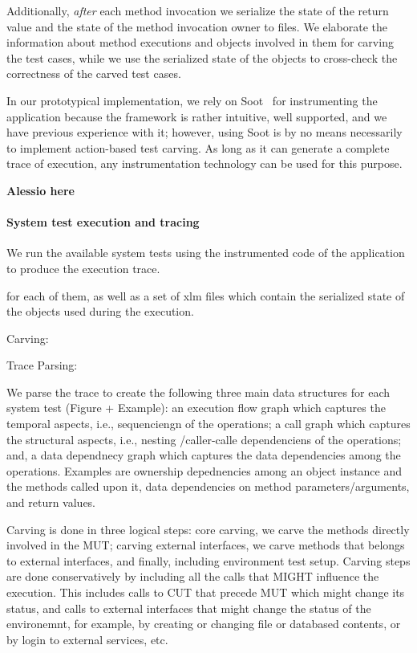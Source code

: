 \documentclass[10pt,conference]{IEEEtran}
\begin{document}
Additionally, \emph{after} each method invocation we serialize the state of the return value and the state of the method invocation owner to files.
%
We elaborate the information about method executions and objects involved in them for carving the test cases, while we use  the serialized state of the objects to cross-check the correctness of the carved test cases.

In our prototypical implementation, we rely on Soot~\cite{} for instrumenting the application because the framework is rather intuitive, well supported, and we have previous experience with it; however, using Soot is by no means necessarily to implement action-based test carving. As long as it can generate a complete trace of execution, any instrumentation technology can be used for this purpose.

\textbf{Alessio here}

\paragraph{System test execution and tracing}
We run the available system tests using the instrumented code of the application to produce the execution trace.

for each of them, as well as a set of xlm files which contain the serialized state of the objects used during the execution.

Carving:

Trace Parsing:

We parse the trace to create the following three main data structures for each system test (Figure + Example):
an execution flow graph which captures the temporal aspects, i.e., sequenciengn of the operations;
a call graph which captures the structural aspects, i.e., nesting /caller-calle dependenciens of the operations;
and, a data dependnecy graph which captures the data dependencies among the operations. Examples are ownership depednencies among an object instance and the methods called upon it, data dependencies on method parameters/arguments, and return values.

Carving is done in three logical steps: core carving, we carve the methods directly involved in the MUT; carving external interfaces, we carve methods that belongs to external interfaces, and finally,  including environment test setup. Carving steps are done conservatively by including all the calls that MIGHT influence the execution. This includes calls to CUT that precede MUT which might change its status, and calls to external interfaces that might change the status of the environemnt, for example, by creating or changing file or databased contents, or by login to external services, etc. 
\end{document}
